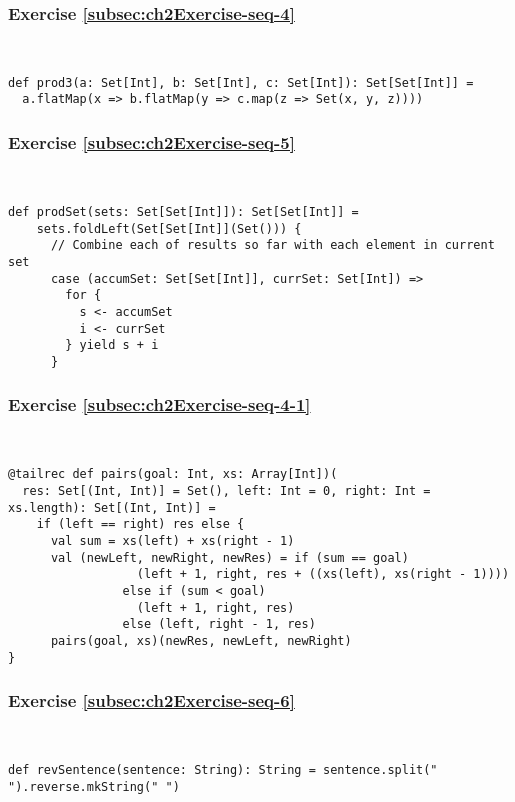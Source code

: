 \subsubsection*{Exercise \ref{subsec:ch2Exercise-seq-4}}

~
\begin{lstlisting}
def prod3(a: Set[Int], b: Set[Int], c: Set[Int]): Set[Set[Int]] =
  a.flatMap(x => b.flatMap(y => c.map(z => Set(x, y, z))))
\end{lstlisting}


\subsubsection*{Exercise \ref{subsec:ch2Exercise-seq-5}}

~
\begin{lstlisting}
def prodSet(sets: Set[Set[Int]]): Set[Set[Int]] =
    sets.foldLeft(Set[Set[Int]](Set())) {
      // Combine each of results so far with each element in current set
      case (accumSet: Set[Set[Int]], currSet: Set[Int]) =>
        for {
          s <- accumSet
          i <- currSet
        } yield s + i
      }
\end{lstlisting}


\subsubsection*{Exercise \ref{subsec:ch2Exercise-seq-4-1}}

~
\begin{lstlisting}
@tailrec def pairs(goal: Int, xs: Array[Int])(
  res: Set[(Int, Int)] = Set(), left: Int = 0, right: Int = xs.length): Set[(Int, Int)] =
    if (left == right) res else {
      val sum = xs(left) + xs(right - 1)
      val (newLeft, newRight, newRes) = if (sum == goal) 
                  (left + 1, right, res + ((xs(left), xs(right - 1)))) 
                else if (sum < goal)
                  (left + 1, right, res)
                else (left, right - 1, res)
      pairs(goal, xs)(newRes, newLeft, newRight)
}
\end{lstlisting}


\subsubsection*{Exercise \ref{subsec:ch2Exercise-seq-6}}

~
\begin{lstlisting}
def revSentence(sentence: String): String = sentence.split(" ").reverse.mkString(" ")
\end{lstlisting}


